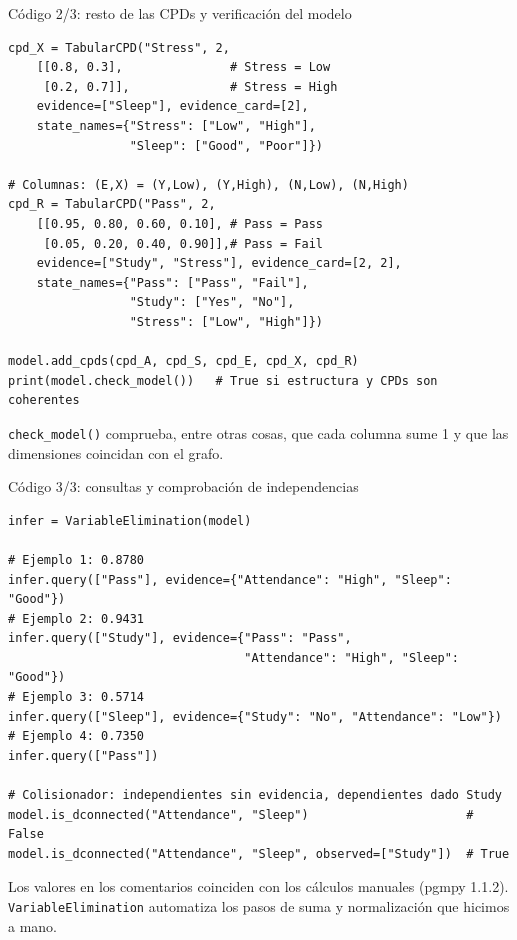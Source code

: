 \documentclass[11pt]{beamer}
\begin{document}
\begin{frame}[fragile]{Código 2/3: resto de las CPDs y verificación del modelo}
\begin{lstlisting}
cpd_X = TabularCPD("Stress", 2,
    [[0.8, 0.3],               # Stress = Low
     [0.2, 0.7]],              # Stress = High
    evidence=["Sleep"], evidence_card=[2],
    state_names={"Stress": ["Low", "High"],
                 "Sleep": ["Good", "Poor"]})

# Columnas: (E,X) = (Y,Low), (Y,High), (N,Low), (N,High)
cpd_R = TabularCPD("Pass", 2,
    [[0.95, 0.80, 0.60, 0.10], # Pass = Pass
     [0.05, 0.20, 0.40, 0.90]],# Pass = Fail
    evidence=["Study", "Stress"], evidence_card=[2, 2],
    state_names={"Pass": ["Pass", "Fail"],
                 "Study": ["Yes", "No"],
                 "Stress": ["Low", "High"]})

model.add_cpds(cpd_A, cpd_S, cpd_E, cpd_X, cpd_R)
print(model.check_model())   # True si estructura y CPDs son coherentes
\end{lstlisting}
  \small
  \texttt{check\_model()} comprueba, entre otras cosas, que cada columna sume 1 y que las dimensiones coincidan con el grafo.
\end{frame}

\begin{frame}[fragile]{Código 3/3: consultas y comprobación de independencias}
\begin{lstlisting}
infer = VariableElimination(model)

# Ejemplo 1: 0.8780
infer.query(["Pass"], evidence={"Attendance": "High", "Sleep": "Good"})
# Ejemplo 2: 0.9431
infer.query(["Study"], evidence={"Pass": "Pass",
                                 "Attendance": "High", "Sleep": "Good"})
# Ejemplo 3: 0.5714
infer.query(["Sleep"], evidence={"Study": "No", "Attendance": "Low"})
# Ejemplo 4: 0.7350
infer.query(["Pass"])

# Colisionador: independientes sin evidencia, dependientes dado Study
model.is_dconnected("Attendance", "Sleep")                      # False
model.is_dconnected("Attendance", "Sleep", observed=["Study"])  # True
\end{lstlisting}
  \small
  Los valores en los comentarios coinciden con los cálculos manuales (pgmpy 1.1.2). \texttt{VariableElimination} automatiza los pasos de suma y normalización que hicimos a mano.
\end{frame}
\end{document}
